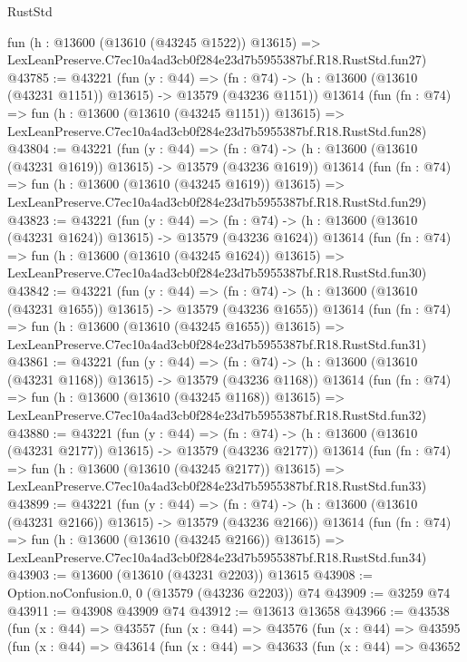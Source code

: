 \begin{lexlean}{RustStd}
\begin{coremodule}
    fun (h : @13600 (@13610 (@43245 @1522)) @13615) =>
    LexLeanPreserve.C7ec10a4ad3cb0f284e23d7b5955387bf.R18.RustStd.fun27)
@43785 := @43221
    (fun (y : @44) =>
    (fn : @74) -> (h : @13600 (@13610 (@43231 @1151)) @13615) -> @13579 (@43236 @1151))
    @13614
    (fun (fn : @74) =>
    fun (h : @13600 (@13610 (@43245 @1151)) @13615) =>
    LexLeanPreserve.C7ec10a4ad3cb0f284e23d7b5955387bf.R18.RustStd.fun28)
@43804 := @43221
    (fun (y : @44) =>
    (fn : @74) -> (h : @13600 (@13610 (@43231 @1619)) @13615) -> @13579 (@43236 @1619))
    @13614
    (fun (fn : @74) =>
    fun (h : @13600 (@13610 (@43245 @1619)) @13615) =>
    LexLeanPreserve.C7ec10a4ad3cb0f284e23d7b5955387bf.R18.RustStd.fun29)
@43823 := @43221
    (fun (y : @44) =>
    (fn : @74) -> (h : @13600 (@13610 (@43231 @1624)) @13615) -> @13579 (@43236 @1624))
    @13614
    (fun (fn : @74) =>
    fun (h : @13600 (@13610 (@43245 @1624)) @13615) =>
    LexLeanPreserve.C7ec10a4ad3cb0f284e23d7b5955387bf.R18.RustStd.fun30)
@43842 := @43221
    (fun (y : @44) =>
    (fn : @74) -> (h : @13600 (@13610 (@43231 @1655)) @13615) -> @13579 (@43236 @1655))
    @13614
    (fun (fn : @74) =>
    fun (h : @13600 (@13610 (@43245 @1655)) @13615) =>
    LexLeanPreserve.C7ec10a4ad3cb0f284e23d7b5955387bf.R18.RustStd.fun31)
@43861 := @43221
    (fun (y : @44) =>
    (fn : @74) -> (h : @13600 (@13610 (@43231 @1168)) @13615) -> @13579 (@43236 @1168))
    @13614
    (fun (fn : @74) =>
    fun (h : @13600 (@13610 (@43245 @1168)) @13615) =>
    LexLeanPreserve.C7ec10a4ad3cb0f284e23d7b5955387bf.R18.RustStd.fun32)
@43880 := @43221
    (fun (y : @44) =>
    (fn : @74) -> (h : @13600 (@13610 (@43231 @2177)) @13615) -> @13579 (@43236 @2177))
    @13614
    (fun (fn : @74) =>
    fun (h : @13600 (@13610 (@43245 @2177)) @13615) =>
    LexLeanPreserve.C7ec10a4ad3cb0f284e23d7b5955387bf.R18.RustStd.fun33)
@43899 := @43221
    (fun (y : @44) =>
    (fn : @74) -> (h : @13600 (@13610 (@43231 @2166)) @13615) -> @13579 (@43236 @2166))
    @13614
    (fun (fn : @74) =>
    fun (h : @13600 (@13610 (@43245 @2166)) @13615) =>
    LexLeanPreserve.C7ec10a4ad3cb0f284e23d7b5955387bf.R18.RustStd.fun34)
@43903 := @13600 (@13610 (@43231 @2203)) @13615
@43908 := Option.noConfusion.{0, 0} (@13579 (@43236 @2203)) @74
@43909 := @3259 @74
@43911 := @43908 @43909 @74
@43912 := @13613 @13658
@43966 := @43538
    (fun (x : @44) =>
    @43557
      (fun (x : @44) =>
      @43576
        (fun (x : @44) =>
        @43595
          (fun (x : @44) =>
          @43614
            (fun (x : @44) =>
            @43633
              (fun (x : @44) =>
              @43652

\end{coremodule}
\end{lexlean}
